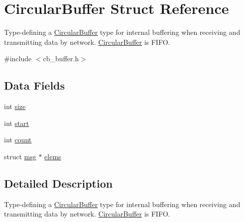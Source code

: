\hypertarget{struct_circular_buffer}{\section{Circular\-Buffer Struct Reference}
\label{struct_circular_buffer}
}


Type-\/defining a \hyperlink{struct_circular_buffer}{Circular\-Buffer} type for internal buffering when receiving and transmitting data by network. \hyperlink{struct_circular_buffer}{Circular\-Buffer} is F\-I\-F\-O.  




{\ttfamily \#include $<$cb\-\_\-buffer.\-h$>$}

\subsection*{Data Fields}
\begin{DoxyCompactItemize}
\item 
int \hyperlink{struct_circular_buffer_a439227feff9d7f55384e8780cfc2eb82}{size}
\item 
int \hyperlink{struct_circular_buffer_a37722a150250e2a5a98e5e0d11e53449}{start}
\item 
int \hyperlink{struct_circular_buffer_ad43c3812e6d13e0518d9f8b8f463ffcf}{count}
\item 
struct \hyperlink{structmsg}{msg} $\ast$ \hyperlink{struct_circular_buffer_af8a90b36e277e8697e9b3f344ee24438}{elems}
\end{DoxyCompactItemize}


\subsection{Detailed Description}
Type-\/defining a \hyperlink{struct_circular_buffer}{Circular\-Buffer} type for internal buffering when receiving and transmitting data by network. \hyperlink{struct_circular_buffer}{Circular\-Buffer} is F\-I\-F\-O. 


